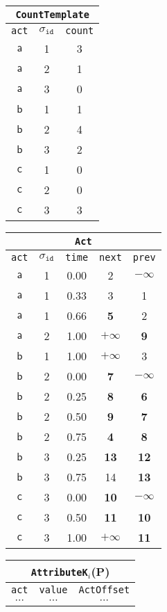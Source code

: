 \begin{figure}\centering
	\begin{tabular}{c|c|c}
	\toprule
	\multicolumn{3}{c}{\texttt{CountTemplate}}\\
	\toprule
	\texttt{act} & $\sigma_{\texttt{id}}$ & \texttt{count}\\
	\midrule
	$\mathsf{a}$& 1 & 3 \\
	$\mathsf{a}$& 2 & 1 \\
	$\mathsf{a}$& 3 & 0 \\
	$\mathsf{b}$& 1 & 1 \\
	$\mathsf{b}$& 2 & 4 \\
	$\mathsf{b}$& 3 & 2 \\
	$\mathsf{c}$& 1 & 0 \\
	$\mathsf{c}$& 2 & 0 \\
	$\mathsf{c}$& 3 & 3 \\
	\bottomrule
\end{tabular} \begin{tabular}{c|c|c|c|c}
\toprule
\multicolumn{5}{c}{\texttt{Act}}\\
\toprule
 \texttt{act} & $\sigma_{\texttt{id}}$ & \texttt{time} & \texttt{next} & \texttt{prev}\\
\midrule
 $\mathsf{a}$ &1 & 0.00 &  2 & $-\infty$\\ 	%
 $\mathsf{a}$ &1 & 0.33 &  3 & 1\\ 			%
 $\mathsf{a}$ &1 & 0.66 &  \textbf{5} & 2\\ 			%
 $\mathsf{a}$ &2 & 1.00 &  $+\infty$ & \textbf{9}\\ 	%
 $\mathsf{b}$ &1 & 1.00 &  $+\infty$ & 3\\	%
 $\mathsf{b}$ &2 & 0.00 &  \textbf{7} & $-\infty$\\ 	%
 $\mathsf{b}$ &2 & 0.25 &  \textbf{8} & \textbf{6}\\ 			%
 $\mathsf{b}$ &2 & 0.50 &  \textbf{9} & \textbf{7}\\ 			%
 $\mathsf{b}$ &2 & 0.75 &  \textbf{4} & \textbf{8}\\ 			%
 $\mathsf{b}$ &3 & 0.25 &  \textbf{13} & \textbf{12}\\ 		%
 $\mathsf{b}$ &3 & 0.75 &  14 & \textbf{13}\\ 		%
 $\mathsf{c}$ &3 & 0.00 &  \textbf{10} & $-\infty$\\ %
 $\mathsf{c}$ &3 & 0.50 &  \textbf{11} & \textbf{10}\\ 		%
 $\mathsf{c}$ &3 & 1.00 &  $+\infty$ & \textbf{11}\\ %
\bottomrule
\end{tabular} \begin{tabular}{c|c|c}
\toprule
\multicolumn{3}{c}{\texttt{AttributeK}$_i$\quad($\mathbf{P}$)}\\
\toprule
 \texttt{act} & \texttt{value} & \texttt{ActOffset}\\
 \midrule
 $\cdots$ & $\cdots$ & $\cdots$\\

\bottomrule
\end{tabular}\end{figure}

